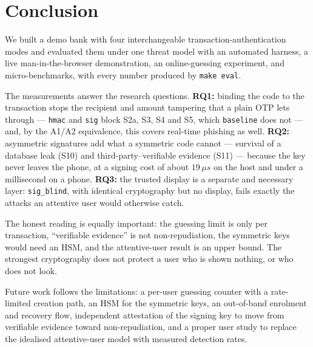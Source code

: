 \section{Conclusion}\label{sec:conclusion}

We built a demo bank with four interchangeable transaction-authentication modes
and evaluated them under one threat model with an automated harness, a live
man-in-the-browser demonstration, an online-guessing experiment, and
micro-benchmarks, with every number produced by \texttt{make eval}.

The measurements answer the research questions. \textbf{RQ1:} binding the code to
the transaction stops the recipient and amount tampering that a plain OTP lets
through --- \texttt{hmac} and \texttt{sig} block S2a, S3, S4 and S5, which
\texttt{baseline} does not --- and, by the A1/A2 equivalence, this covers
real-time phishing as well. \textbf{RQ2:} asymmetric signatures add what a
symmetric code cannot --- survival of a database leak (S10) and
third-party--verifiable evidence (S11) --- because the key never leaves the
phone, at a signing cost of about $19\,\mu s$ on the host and under a millisecond
on a phone. \textbf{RQ3:} the trusted display is a separate and necessary layer:
\texttt{sig\_blind}, with identical cryptography but no display, fails exactly the
attacks an attentive user would otherwise catch.

The honest reading is equally important: the guessing limit is only per
transaction, ``verifiable evidence'' is not non-repudiation, the symmetric keys
would need an HSM, and the attentive-user result is an upper bound. The strongest
cryptography does not protect a user who is shown nothing, or who does not look.

Future work follows the limitations: a per-user guessing counter with a
rate-limited creation path, an HSM for the symmetric keys, an out-of-band
enrolment and recovery flow, independent attestation of the signing key to move
from verifiable evidence toward non-repudiation, and a proper user study to
replace the idealised attentive-user model with measured detection rates.
